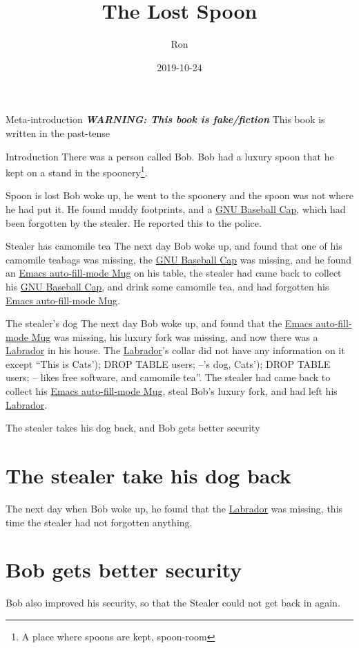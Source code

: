 \documentclass[openany]{book}
\newcommand{\warning}[1]{\textbf{\textit{WARNING: #1}}}
\newcommand{\GNUBaseballCap}{\href{https://shop.fsf.org/caps/gnu-baseball-cap}{GNU Baseball Cap}}
\newcommand{\EmacsMug}{\href{https://shop.fsf.org/gear/emacs-auto-fill-mode-mug}{Emacs auto-fill-mode Mug}}
\newcommand{\Labrador}{\href{https://en.wikipedia.org/wiki/Labrador\_Retriever}{Labrador}}
\newcommand{\CatsName}{Cats'); DROP TABLE users; --}
\begin{document}
\title{The Lost Spoon}
\author{Ron}
\date{2019-10-24}
\maketitle

\begin{chapter}{Meta-introduction}
  \doclicenseThis
  \warning{This book is fake/fiction}
  \newline
  This book is written in the past-tense
\end{chapter}

\begin{chapter}{Introduction}
  There was a person called Bob.
  Bob had a luxury spoon that he kept on a stand in the spoonery\footnote{A place where spoons are kept, spoon-room}.
\end{chapter}

\begin{chapter}{Spoon is lost}
  Bob woke up, he went to the spoonery and the spoon was not where he had put it.
  He found muddy footprints, and a \GNUBaseballCap, which had been forgotten by the stealer.
  He reported this to the police.
\end{chapter}

\begin{chapter}{Stealer has camomile tea}
  The next day Bob woke up, and found that one of his camomile teabags was missing, the \GNUBaseballCap{} was missing,
  and he found an \EmacsMug{} on his table, the stealer had came back to collect his \GNUBaseballCap, and drink some camomile tea,
  and had forgotten his \EmacsMug.
\end{chapter}

\begin{chapter}{The stealer's dog}
  The next day Bob woke up, and found that the \EmacsMug{} was missing, his luxury fork was missing,
  and now there was a \Labrador{} in his house.
  The \Labrador's collar did not have any information on it except ``This is \CatsName's dog, \CatsName{} likes free software, and camomile tea''.
  The stealer had came back to collect his \EmacsMug, steal Bob's luxury fork, and had left his \Labrador.
\end{chapter}

\begin{chapter}{The stealer takes his dog back, and Bob gets better security}
  \section{The stealer take his dog back}{
    The next day when Bob woke up, he found that the \Labrador{} was missing, this time the stealer had not forgotten anything.
  }
  \section{Bob gets better security}{
    Bob also improved his security, so that the Stealer could not get back in again.
  }
\end{chapter}
\end{document}
